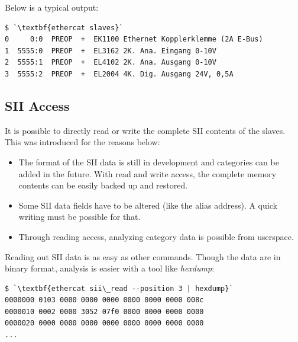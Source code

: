 \documentclass[a4paper,12pt,BCOR6mm,bibtotoc,idxtotoc]{scrbook}
\begin{document}


Below is a typical output:

\begin{lstlisting}
$ `\textbf{ethercat slaves}`
0     0:0  PREOP  +  EK1100 Ethernet Kopplerklemme (2A E-Bus)
1  5555:0  PREOP  +  EL3162 2K. Ana. Eingang 0-10V
2  5555:1  PREOP  +  EL4102 2K. Ana. Ausgang 0-10V
3  5555:2  PREOP  +  EL2004 4K. Dig. Ausgang 24V, 0,5A
\end{lstlisting}


\subsection{SII Access}
\label{sec:siiaccess}

It is possible to directly read or write the complete SII contents of the
slaves. This was introduced for the reasons below:

\begin{itemize}

\item The format of the SII data is still in development and categories can be
added in the future. With read and write access, the complete memory contents
can be easily backed up and restored.

\item Some SII data fields have to be altered (like the alias address). A quick
writing must be possible for that.

\item Through reading access, analyzing category data is possible from
userspace.

\end{itemize}



Reading out SII data is as easy as other commands. Though the data are in
binary format, analysis is easier with a tool like \textit{hexdump}:

\begin{lstlisting}
$ `\textbf{ethercat sii\_read --position 3 | hexdump}`
0000000 0103 0000 0000 0000 0000 0000 0000 008c
0000010 0002 0000 3052 07f0 0000 0000 0000 0000
0000020 0000 0000 0000 0000 0000 0000 0000 0000
...
\end{lstlisting}
\end{document}
